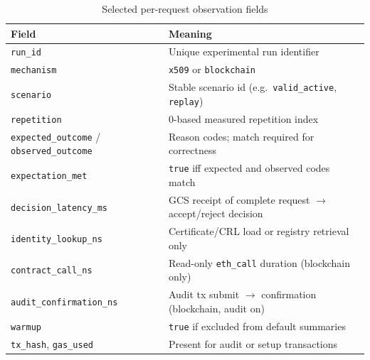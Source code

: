 \begin{table}[htbp]
    \centering
    \caption{Selected per-request observation fields}
    \label{tab:app-obs-fields}
    \small
    \begin{tabular}{|p{}|p{}|}
        \hline
        \textbf{Field} & \textbf{Meaning} \\
        \hline
        \texttt{run\_id} & Unique experimental run identifier \\
        \hline
        \texttt{mechanism} & \texttt{x509} or \texttt{blockchain} \\
        \hline
        \texttt{scenario} & Stable scenario id (e.g.\ \texttt{valid\_active}, \texttt{replay}) \\
        \hline
        \texttt{repetition} & 0-based measured repetition index \\
        \hline
        \texttt{expected\_outcome} / \texttt{observed\_outcome} & Reason codes; match required for correctness \\
        \hline
        \texttt{expectation\_met} & \texttt{true} iff expected and observed codes match \\
        \hline
        \texttt{decision\_latency\_ms} & GCS receipt of complete request $\rightarrow$ accept/reject decision \\
        \hline
        \texttt{identity\_lookup\_ns} & Certificate/CRL load or registry retrieval only \\
        \hline
        \texttt{contract\_call\_ns} & Read-only \texttt{eth\_call} duration (blockchain only) \\
        \hline
        \texttt{audit\_confirmation\_ns} & Audit tx submit $\rightarrow$ confirmation (blockchain, audit on) \\
        \hline
        \texttt{warmup} & \texttt{true} if excluded from default summaries \\
        \hline
        \texttt{tx\_hash}, \texttt{gas\_used} & Present for audit or setup transactions \\
        \hline
    \end{tabular}
\end{table}


